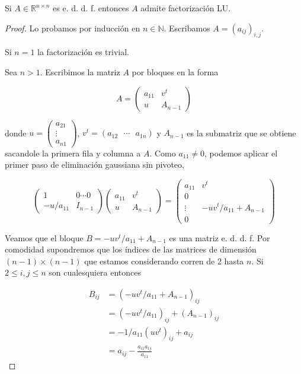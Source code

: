 \begin{propo}
Si $A \in \mathbb{R}^{n \times n}$ es e. d. d. f. entonces $A$ admite factorización LU.

\begin{proof}
Lo probamos por inducción en $n \in \mathbb{N}$. Escribamos $A = (a_{ij})_{i, j}$.

Si $n = 1$ la factorización es trivial.

Sea $n > 1$. Escribimos la matriz $A$ por bloques en la forma

\[A = \left(\begin{array}{c|c}
a_{11} & v^t\\ \hline
u & A_{n - 1}
\end{array}\right)\]

donde $u = \begin{pmatrix}a_{21} \\ \vdots \\ a_{n1} \end{pmatrix}$, $v^t = (a_{12} \text{ } \cdots \text{ } a_{1n})$ y $A_{n - 1}$ es la submatriz que se obtiene sacandole la primera fila y columna a $A$. Como $a_{11} \neq 0$, podemos aplicar el primer paso de eliminación gaussiana sin pivoteo,

\[\left(\begin{array}{c|c}
1 & 0 \cdots 0\\ \hline
-u / a_{11} & I_{n - 1}
\end{array}\right)
\left(\begin{array}{c|c}
a_{11} & v^t\\ \hline
u & A_{n - 1}
\end{array}\right) =
\left(\begin{array}{c|c}
a_{11} & v^t\\ \hline
0 & \\
\vdots & -uv^t / a_{11} + A_{n - 1}\\
0 &
\end{array}\right)\]

Veamos que el bloque $B = -uv^t / a_{11} + A_{n - 1}$ es una matriz e. d. d. f. Por comodidad supondremos que los índices de las matrices de dimensión $(n - 1) \times (n - 1)$ que estamos considerando corren de 2 hasta $n$. Si $2 \leq i, j \leq n$ son cualesquiera entonces

\begin{align*}
B_{ij} & = (-uv^t / a_{11} + A_{n - 1})_{ij} \\
& = (-uv^t / a_{11})_{ij} + (A_{n - 1})_{ij}\\
& = -1 / a_{11} (uv^t)_{ij} + a_{ij}\\
& = a_{ij} - \frac{a_{i1}a_{1j}}{a_{11}}
\end{align*}


\end{proof}
\end{propo}
